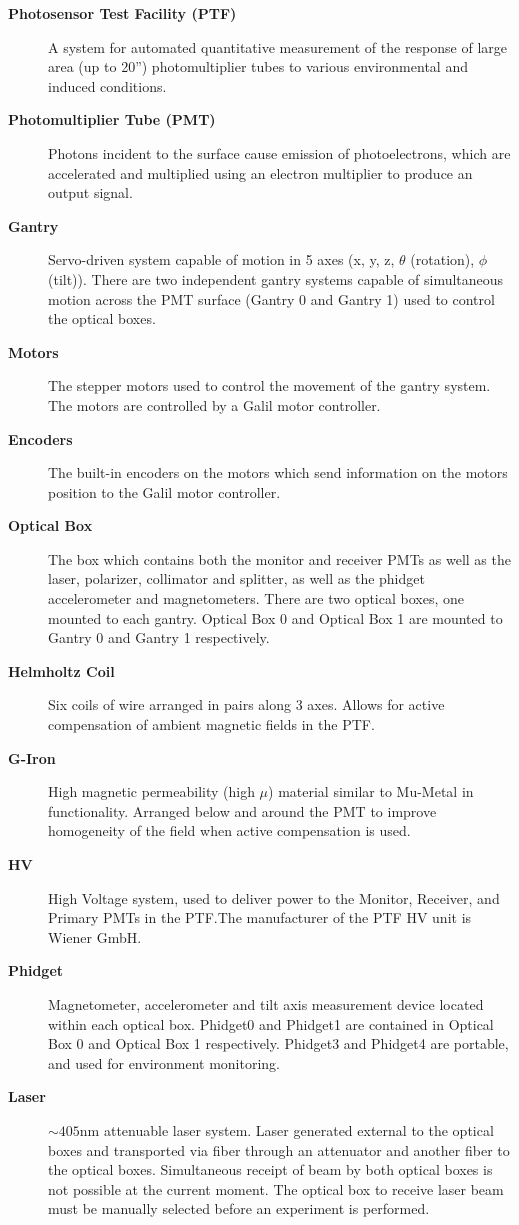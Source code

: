\documentclass[twoside,letterpaper]{refart}
\begin{document}
\begin{description}
	\item[\textbf{Photosensor Test Facility (PTF)}] A system for automated quantitative measurement of the response of large area (up to 20'') photomultiplier tubes to various environmental and induced conditions.
	\item[\textbf{Photomultiplier Tube (PMT)}] Photons incident to the surface cause emission of photoelectrons, which are accelerated and multiplied using an electron multiplier to produce an output signal.
	\item[\textbf{Gantry}] Servo-driven system capable of motion in 5 axes (x, y, z, $\theta$ (rotation), $\phi$ (tilt)). There are two independent gantry systems capable of simultaneous motion across the PMT surface (Gantry 0 and Gantry 1) used to control the optical boxes.
	\item[\textbf{Motors}] The stepper motors used to control the movement of the gantry system. The motors are controlled by a Galil motor controller.
	\item[\textbf{Encoders}] The built-in encoders on the motors which send information on the motors position to the Galil motor controller.
	\item[\textbf{Optical Box}] The box which contains both the monitor and receiver PMTs as well as the laser, polarizer, collimator and splitter, as well as the phidget accelerometer and magnetometers. There are two optical boxes, one mounted to each gantry. Optical Box 0 and Optical Box 1 are mounted to Gantry 0 and Gantry 1 respectively.
	\item[\textbf{Helmholtz Coil}] Six coils of wire arranged in pairs along 3 axes. Allows for active compensation of ambient magnetic fields in the PTF.
	\item[\textbf{G-Iron}] High magnetic permeability (high $\mu$) material similar to Mu-Metal in functionality. Arranged below and around the PMT to improve homogeneity of the field when active compensation is used.
	\item[\textbf{HV}] High Voltage system, used to deliver power to the Monitor, Receiver, and Primary PMTs in the PTF.\@ The manufacturer of the PTF HV unit is Wiener GmbH.
	\item[\textbf{Phidget}] Magnetometer, accelerometer and tilt axis measurement device located within each optical box. Phidget0 and Phidget1 are contained in Optical Box 0 and Optical Box 1 respectively. Phidget3 and Phidget4 are portable, and used for environment monitoring.
	\item[\textbf{Laser}] $\sim\!405\text{nm}$ attenuable laser system. Laser generated external to the optical boxes and transported via fiber through an attenuator and another fiber to the optical boxes. Simultaneous receipt of beam by both optical boxes is not possible at the current moment. The optical box to receive laser beam must be manually selected before an experiment is performed.

\end{description}
\end{document}
